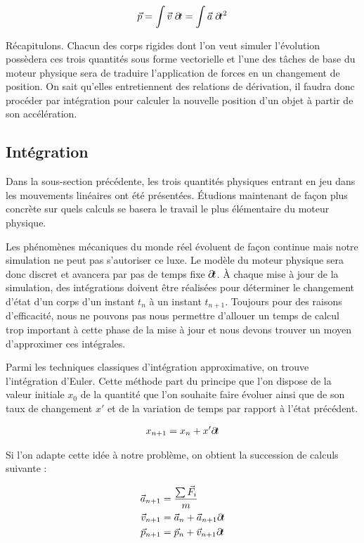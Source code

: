 \begin{align*}
  \vec{p} = \int \vec{v}\; \partial \! t = \int \vec{a}\; \partial \! t^2
\end{align*}

Récapitulons. Chacun des corps rigides dont l'on veut simuler l'évolution possèdera ces trois quantités sous forme vectorielle et l'une des tâches de base du moteur physique sera de traduire l'application de forces en un changement de position. On sait qu'elles entretiennent des relations de dérivation, il faudra donc procéder par intégration pour calculer la nouvelle position d'un objet à partir de son accélération.

\subsection{Intégration}

Dans la sous-section précédente, les trois quantités physiques entrant en jeu dans les mouvements linéaires ont été présentées. \'Etudions maintenant de façon plus concrète sur quels calculs se basera le travail le plus élémentaire du moteur physique.

Les phénomènes mécaniques du monde réel évoluent de façon continue mais notre simulation ne peut pas s'autoriser ce luxe. Le modèle du moteur physique sera donc discret et avancera par pas de temps fixe $\partial \! t$. \`A chaque mise à jour de la simulation, des intégrations doivent être réalisées pour déterminer le changement d'état d'un corps d'un instant $t_n$ à un instant $t_{n+1}$. Toujours pour des raisons d'efficacité, nous ne pouvons pas nous permettre d'allouer un temps de calcul trop important à cette phase de la mise à jour et nous devons trouver un moyen d'approximer ces intégrales.

Parmi les techniques classiques d'intégration approximative, on trouve l'intégration d'Euler. Cette méthode part du principe que l'on dispose de la valeur initiale $x_0$ de la quantité que l'on souhaite faire évoluer ainsi que de son taux de changement $x'$ et de la variation de temps par rapport à l'état précédent.

\begin{align*}
  x_{n+1} = x_{n} + x' \partial \! t
\end{align*}

Si l'on adapte cette idée à notre problème, on obtient la succession de calculs suivante :

\begin{align*}
  \vec{a}_{n+1} &= \frac{\sum \vec{F}_i}{m} \\
  \vec{v}_{n+1} &= \vec{a}_n + \vec{a}_{n+1} \partial \! t \\
  \vec{p}_{n+1} &= \vec{p}_n + \vec{v}_{n+1} \partial \! t
\end{align*}


